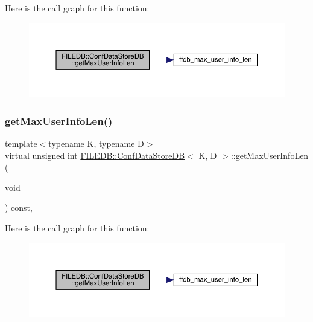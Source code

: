 Here is the call graph for this function\+:
\nopagebreak
\begin{figure}[H]
\begin{center}
\leavevmode
\includegraphics[width=350pt]{d8/d19/classFILEDB_1_1ConfDataStoreDB_a0fc37111156b6c7080ff6a6831c847fc_cgraph}
\end{center}
\end{figure}
\mbox{\label{classFILEDB_1_1ConfDataStoreDB_a0fc37111156b6c7080ff6a6831c847fc}} 
\subsubsection{\texorpdfstring{getMaxUserInfoLen()}{getMaxUserInfoLen()}\hspace{0.1cm}{\footnotesize\ttfamily [2/3]}}
{\footnotesize\ttfamily template$<$typename K, typename D$>$ \\
virtual unsigned int \mbox{\hyperlink{classFILEDB_1_1ConfDataStoreDB}{F\+I\+L\+E\+D\+B\+::\+Conf\+Data\+Store\+DB}}$<$ K, D $>$\+::get\+Max\+User\+Info\+Len (\begin{DoxyParamCaption}\item[{void}]{ }\end{DoxyParamCaption}) const\hspace{0.3cm}{\ttfamily [inline]}, {\ttfamily [virtual]}}

Here is the call graph for this function\+:
\nopagebreak
\begin{figure}[H]
\begin{center}
\leavevmode
\includegraphics[width=350pt]{d8/d19/classFILEDB_1_1ConfDataStoreDB_a0fc37111156b6c7080ff6a6831c847fc_cgraph}
\end{center}
\end{figure}
\mbox{\label{classFILEDB_1_1ConfDataStoreDB_a0fc37111156b6c7080ff6a6831c847fc}} 
